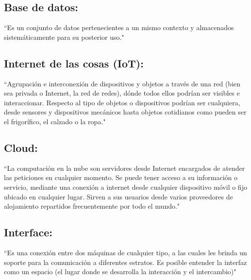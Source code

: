 \subsection{Base de datos:} ``Es un conjunto de datos pertenecientes a un mismo contexto y almacenados sistemáticamente para su posterior uso."\textcolor{blue}{\cite{BASE}}
	
%	
	
\subsection{Internet de las cosas (IoT):} ``Agrupación e interconexión de dispositivos y objetos a través de una red (bien sea privada o Internet, la red de redes), dónde todos ellos podrían ser visibles e interaccionar. Respecto al tipo de objetos o dispositivos podrían ser cualquiera, desde sensores y dispositivos mecánicos hasta objetos cotidianos como pueden ser el frigorífico, el calzado o la ropa."\textcolor{blue}{\cite{IOT}}
	
\subsection{Cloud:} ``La computación en la nube son servidores desde Internet encargados de atender las peticiones en cualquier momento. Se puede tener acceso a su información o servicio, mediante una conexión a internet desde cualquier dispositivo móvil o fijo ubicado en cualquier lugar. Sirven a sus usuarios desde varios proveedores de alojamiento repartidos frecuentemente por todo el mundo."\textcolor{blue}{\cite{nube}}
	
\subsection{Interface:} ``Es una conexión entre dos máquinas de cualquier tipo, a las cuales les brinda un soporte para la comunicación a diferentes estratos. Es posible entender la interfaz como un espacio (el lugar donde se desarrolla la interacción y el intercambio)"\textcolor{blue}{\cite{interface}}
    \\

